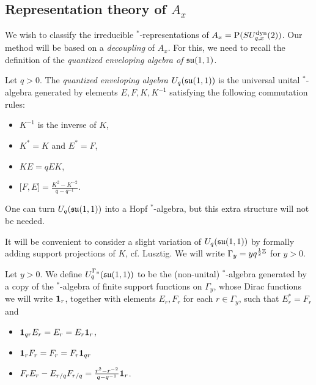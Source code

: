 \subsection{Representation theory of $A_x$}

We wish to classify the irreducible $^*$-representations of $A_x= \operatorname{\mathrm{P}}(SU_{q,x}^{\operatorname{\mathrm{dyn}}}(2))$. Our method will be based on a \emph{decoupling} of $A_x$. For this, we need to recall the definition of the \emph{quantized enveloping algebra of $\mathfrak{su}(1,1)$}. %

\begin{Def} Let $q>0$. The \emph{quantized enveloping algebra $U_q(\mathfrak{su}(1,1))$} is the universal unital $^*$-algebra generated by elements $E,F,K,K^{-1}$ satisfying the following commutation rules: 
\begin{itemize}
\item $K^{-1}$ is the inverse of $K$, 
\item $K^* = K$ and $E^* = F$, 
\item $KE = qEK$,
\item $\lbrack F,E\rbrack = \frac{K^2-K^{-2}}{q-q^{-1}}$.
\end{itemize}
\end{Def}

One can turn $U_q(\mathfrak{su}(1,1))$ into a Hopf $^*$-algebra, but this extra structure will not be needed. 

It will be convenient to consider a slight variation of $U_q(\mathfrak{su}(1,1))$ by formally adding support projections of $K$, cf. Lusztig. We will write $\Gamma_y = yq^{\frac{1}{2}\mathbb{Z}}$  for $y>0$.

\begin{Def} Let $y>0$. We define $U_q^{\Gamma_y}(\mathfrak{su}(1,1))$ to be the (non-unital) $^*$-algebra generated by a copy of the $^*$-algebra of finite support functions on $\Gamma_y$, whose Dirac functions we will write $\mathbf{1}_r$, together with elements $E_{r},F_r$ for each $r\in \Gamma_y$, such that $E_{r}^* = F_{r}$ and 
\begin{itemize}
\item $\mathbf{1}_{qr}E_{r} = E_{r} = E_{r}\mathbf{1}_{r}$, 
\item $\mathbf{1}_r F_r = F_r  = F_r\mathbf{1}_{qr}$
\item $F_{r}E_{r} - E_{r/q}F_{r/q}  = \frac{r^2-r^{-2}}{q-q^{-1}} \mathbf{1}_{r}$.
\end{itemize}
\end{Def} 

